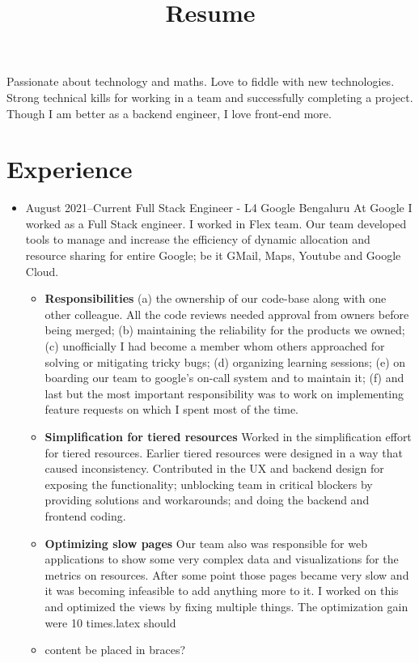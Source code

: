 \documentclass[11pt,a4paper,sans]{moderncv}
\title{Resume}
\begin{document}
\makecvtitle
\small
Passionate about technology and maths. Love to fiddle with new technologies. Strong technical kills for working in a team and successfully completing a project. Though I am better as a backend engineer, I love front-end more.
\section{Experience}
\vspace{6pt}
\begin{itemize}
  \item
    \cventry
    {August 2021--Current}
    {Full Stack Engineer - L4}
    {Google}
    {Bengaluru}
    {}
    {}
    \vspace {5pt}
    At Google I worked as a Full Stack engineer. I worked in Flex team. Our team developed tools to manage and increase the efficiency of dynamic allocation and resource sharing for entire Google; be it GMail, Maps, Youtube and Google Cloud.
    \vspace {2pt}
    \begin {itemize}
      \item
        \textbf {Responsibilities}
        (a) the ownership of our code-base along with one other colleague. All the code reviews needed approval from owners before being merged; (b) maintaining the reliability for the products we owned; (c) unofficially I had become a member whom others approached for solving or mitigating tricky bugs; (d) organizing learning sessions; (e) on boarding our team to google's on-call system and to maintain it; (f) and last but the most important responsibility was to work on implementing feature requests on which I spent most of the time.
      \vspace {2pt}
      \item
        \textbf {Simplification for tiered resources}
        Worked in the simplification effort for tiered resources. Earlier tiered resources were designed in a way that caused inconsistency. Contributed in the UX and backend design for exposing the functionality; unblocking team in critical blockers by providing solutions and workarounds; and doing the backend and frontend coding.
      \vspace {2pt}
      \item
        \textbf {Optimizing slow pages}
        Our team also was responsible for web applications to show some very complex data and visualizations for the metrics on resources. After some point those pages became very slow and it was becoming infeasible to add anything more to it. I worked on this and optimized the views by fixing multiple things. The optimization gain were 10 times.latex should \item content be placed in braces?

\end{itemize}
\end{itemize}
\end{document}
